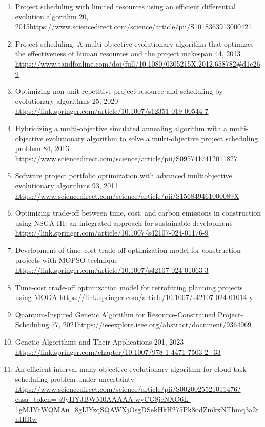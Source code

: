 \documentclass[a4paper,12pt]{article}
\begin{document}
\begin{enumerate}
  \item Project scheduling with limited resources using an efficient differential evolution algorithm 20, 2015\url{https://www.sciencedirect.com/science/article/pii/S1018363913000421}
  \item Project scheduling: A multi-objective evolutionary algorithm that optimizes the effectiveness of human resources and the project makespan 44, 2013 \url{https://www.tandfonline.com/doi/full/10.1080/0305215X.2012.658782#d1e269}
  \item Optimizing non-unit repetitive project resource and scheduling by evolutionary algorithms 25, 2020 \url{https://link.springer.com/article/10.1007/s12351-019-00544-7}
  \item Hybridizing a multi-objective simulated annealing algorithm with a multi-objective evolutionary algorithm to solve a multi-objective project scheduling problem 84, 2013 \url{https://www.sciencedirect.com/science/article/pii/S0957417412011827}
  \item Software project portfolio optimization with advanced multiobjective evolutionary algorithms 93, 2011 \url{https://www.sciencedirect.com/science/article/pii/S156849461000089X}
  \item Optimizing trade-off between time, cost, and carbon emissions in construction using NSGA-III: an integrated approach for sustainable development \url{https://link.springer.com/article/10.1007/s42107-024-01176-9}
  \item Development of time–cost trade-off optimization model for construction projects with MOPSO technique \url{https://link.springer.com/article/10.1007/s42107-024-01063-3}
  \item Time-cost trade-off optimization model for retrofitting planning projects using MOGA \url{https://link.springer.com/article/10.1007/s42107-024-01014-y}
  \item Quantum-Inspired Genetic Algorithm for Resource-Constrained Project-Scheduling 77, 2021\url{https://ieeexplore.ieee.org/abstract/document/9364969}
  \item Genetic Algorithms and Their Applications 201, 2023 \url{https://link.springer.com/chapter/10.1007/978-1-4471-7503-2_33}
  \item An efficient interval many-objective evolutionary algorithm for cloud task scheduling problem under uncertainty \url{https://www.sciencedirect.com/science/article/pii/S0020025521011476?casa_token=-s9yHYJBWM0AAAAA:wyCG8jeNXO6L-1gMJYtWQMAu_8gIJYzqSQAWXjOsgDSekHkH275Pk8odZmkxNThmq3a2rnHfRw}

\end{enumerate}
\end{document}
